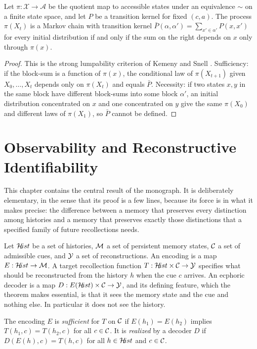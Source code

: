\begin{proposition}\label{prop:accmarkov}
Let $\pi:\mathcal X\to\mathcal A$ be the quotient map to accessible states under an equivalence $\sim$ on a finite state space, and let $P$ be a transition kernel for fixed $(c,a)$. The process $\pi(X_t)$ is a Markov chain with transition kernel $\bar P(\alpha,\alpha')=\sum_{x'\in\alpha'}P(x,x')$ for every initial distribution if and only if the sum on the right depends on $x$ only through $\pi(x)$.
\end{proposition}

\begin{proof}
This is the strong lumpability criterion of Kemeny and Snell \cite{kemeny1960}. Sufficiency: if the block-sum is a function of $\pi(x)$, the conditional law of $\pi(X_{t+1})$ given $X_0,\dots,X_t$ depends only on $\pi(X_t)$ and equals $\bar P$. Necessity: if two states $x,y$ in the same block have different block-sums into some block $\alpha'$, an initial distribution concentrated on $x$ and one concentrated on $y$ give the same $\pi(X_0)$ and different laws of $\pi(X_1)$, so $\bar P$ cannot be defined.
\end{proof}

\chapter{Observability and Reconstructive Identifiability}\label{ch:ident}

This chapter contains the central result of the monograph. It is deliberately elementary, in the sense that its proof is a few lines, because its force is in what it makes precise: the difference between a memory that preserves every distinction among histories and a memory that preserves exactly those distinctions that a specified family of future recollections needs.

Let $\mathcal{H}\!ist$ be a set of histories, $\mathcal{M}$ a set of persistent memory states, $\mathcal{C}$ a set of admissible cues, and $\mathcal{Y}$ a set of reconstructions. An encoding is a map $E:\mathcal{H}\!ist\to\mathcal{M}$. A target recollection function $T:\mathcal{H}\!ist\times\mathcal{C}\to\mathcal{Y}$ specifies what should be reconstructed from the history $h$ when the cue $c$ arrives. An ecphoric decoder is a map $D:E(\mathcal{H}\!ist)\times\mathcal{C}\to\mathcal{Y}$, and its defining feature, which the theorem makes essential, is that it sees the memory state and the cue and nothing else. In particular it does not see the history.

\begin{definition}\label{def:suff}
The encoding $E$ is \emph{sufficient} for $T$ on $\mathcal{C}$ if $E(h_1)=E(h_2)$ implies $T(h_1,c)=T(h_2,c)$ for all $c\in\mathcal{C}$. It is \emph{realized} by a decoder $D$ if $D(E(h),c)=T(h,c)$ for all $h\in\mathcal{H}\!ist$ and $c\in\mathcal{C}$.
\end{definition}

